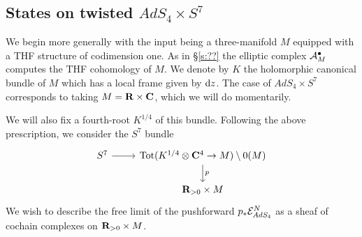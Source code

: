 \documentclass[../main.tex]{subfiles}
\begin{document}

\subsection{States on twisted $AdS_4\times S^7$}\label{s:ads4states}
We begin more generally with the input being a three-manifold $M$ equipped with a THF structure of codimension one.
As in \S \ref{s:??} the elliptic complex $\mathcal A^\bullet_M$ computes the THF cohomology of $M$.
We denote by $K$ the holomorphic canonical bundle of $M$ which has a local frame given by $\mathrm{d} z$.
The case of $AdS_4 \times S^7$ corresponds to taking $M = \mathbf{R} \times \mathbf{C}$, which we will do momentarily.

We will also fix a fourth-root $K^{1/4}$ of this bundle.
Following the above prescription, we consider the $S^7$ bundle 
\[
\begin{tikzcd}
S^7 \ar[r] & \operatorname{Tot} (K^{1/4} \otimes \C^4 \to M) \setminus 0(M) \ar[d, "p"] \\ & \R_{>0}\times M
\end{tikzcd}
\]
We wish to describe the free limit of the pushforward $p_* \mathcal{E}^N_{AdS_4}$ as a sheaf of cochain complexes on $\mathbf{R}_{>0}\times M$. 
\end{document}
